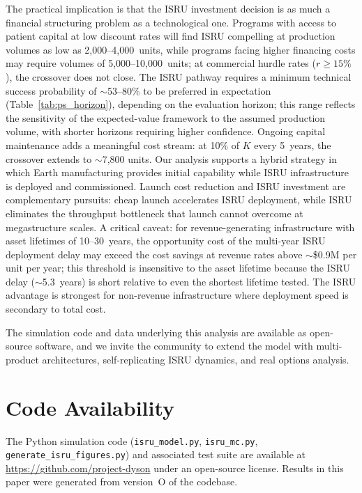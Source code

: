 \documentclass[preprint,12pt]{elsarticle}
\begin{document}
The practical implication is that the ISRU investment decision is as much a financial structuring problem as a technological one. Programs with access to patient capital at low discount rates will find ISRU compelling at production volumes as low as 2{,}000--4{,}000~units, while programs facing higher financing costs may require volumes of 5{,}000--10{,}000~units; at commercial hurdle rates ($r \geq 15\%$), the crossover does not close. The ISRU pathway requires a minimum technical success probability of $\sim$53--80\% to be preferred in expectation (Table~\ref{tab:ps_horizon}), depending on the evaluation horizon; this range reflects the sensitivity of the expected-value framework to the assumed production volume, with shorter horizons requiring higher confidence. Ongoing capital maintenance adds a meaningful cost stream: at 10\% of $K$ every 5~years, the crossover extends to $\sim$7{,}800 units. Our analysis supports a hybrid strategy in which Earth manufacturing provides initial capability while ISRU infrastructure is deployed and commissioned. Launch cost reduction and ISRU investment are complementary pursuits: cheap launch accelerates ISRU deployment, while ISRU eliminates the throughput bottleneck that launch cannot overcome at megastructure scales. A critical caveat: for revenue-generating infrastructure with asset lifetimes of 10--30~years, the opportunity cost of the multi-year ISRU deployment delay may exceed the cost savings at revenue rates above ${\sim}$\$0.9M per unit per year; this threshold is insensitive to the asset lifetime because the ISRU delay ($\sim$5.3~years) is short relative to even the shortest lifetime tested. The ISRU advantage is strongest for non-revenue infrastructure where deployment speed is secondary to total cost.

The simulation code and data underlying this analysis are available as open-source software, and we invite the community to extend the model with multi-product architectures, self-replicating ISRU dynamics, and real options analysis.

\section*{Code Availability}

The Python simulation code (\texttt{isru\_model.py}, \texttt{isru\_mc.py}, \texttt{generate\_isru\_figures.py}) and associated test suite are available at \url{https://github.com/project-dyson} under an open-source license. Results in this paper were generated from version~O of the codebase.
\end{document}
